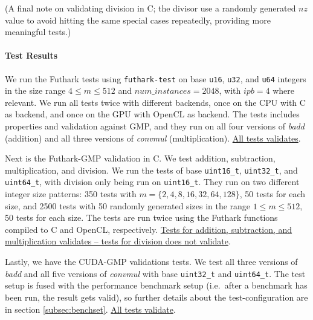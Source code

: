 (A final note on validating division in C; the divisor use a randomly generated
$nz$ value to avoid hitting the same special cases repeatedly, providing more
meaningful tests.)

\paragraph{Test Results}
We run the Futhark tests using \texttt{futhark-test} on base \texttt{u16},
\texttt{u32}, and \texttt{u64} integers in the size range $4\leq m \leq 512$ and
$num\_instances = 2048$, with $ipb = 4$ where relevant. We run all tests twice
with different backends, once on the CPU with C as backend, and once on the GPU
with OpenCL as backend. The tests includes properties and validation against
GMP, and they run on all four versions of \textit{badd} (addition) and all three
versions of \textit{convmul} (multiplication). \uline{All tests validates}.

Next is the Futhark-GMP validation in C. We test addition, subtraction,
multiplication, and division. We run the tests of base \texttt{uint16\_t},
\texttt{uint32\_t}, and \texttt{uint64\_t}, with division only being run on
\texttt{uint16\_t}. They run on two different integer size patterns: 350 tests
with $m=\{2,4,8,16,32,64,128\}$, 50 tests for each size, and 2500 tests with 50
randomly generated sizes in the range $1\leq m \leq 512$, 50 tests for each size. The
tests are run twice using the Futhark functions compiled to C and OpenCL,
respectively. \uline{Tests for addition, subtraction, and multiplication
  validates -- tests for division does not validate}.

Lastly, we have the CUDA-GMP validations tests. We test all three versions of
\textit{badd} and all five versions of \textit{convmul} with base
\texttt{uint32\_t} and \texttt{uint64\_t}. The test setup is fused with the
performance benchmark setup (i.e.\ after a benchmark has been run, the result
gets valid), so further details about the test-configuration are in section
\ref{subsec:benchset}. \uline{All tests validate}.

